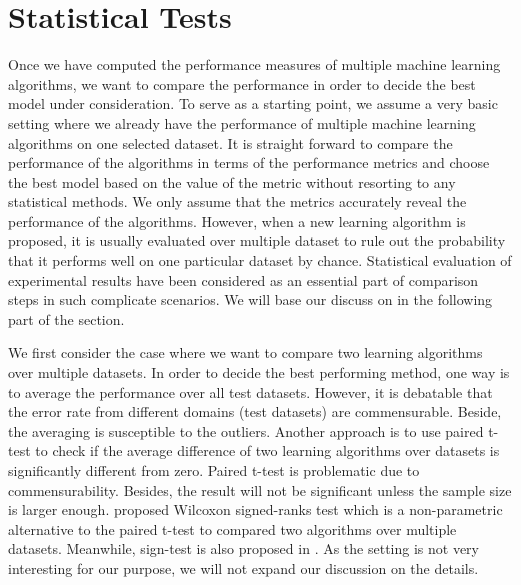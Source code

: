 {%
%
\section{Statistical Tests} \label{sc_st}

Once we have computed the performance measures of multiple machine learning algorithms, we want to compare the performance in order to decide the best model under consideration. 
To serve as a starting point, we assume a very basic setting where we already have the performance of multiple machine learning algorithms on one selected dataset.
It is straight forward to compare the performance of the algorithms in terms of the performance metrics and choose the best model based on the value of the metric without resorting to any statistical methods.
We only assume that the metrics accurately reveal the performance of the algorithms.
However, when a new learning algorithm is proposed, it is usually evaluated over multiple dataset to rule out the probability that it performs well on one particular dataset by chance.
Statistical evaluation of experimental results have been considered as an essential part of comparison steps in such complicate scenarios.
We will base our discuss on \citep{Demsar06statistical,Garcia08an} in the following part of the section.

We first consider the case where we want to compare two learning algorithms over multiple datasets.
In order to decide the best performing method, one way is to average the performance over all test datasets.
However, it is debatable that the error rate from different domains (test datasets) are commensurable.
Beside, the averaging is susceptible to the outliers.
Another approach is to use paired t-test to check if the average difference of two learning algorithms over datasets is significantly different from zero.
Paired t-test is problematic due to commensurability.
Besides, the result will not be significant unless the sample size is larger enough.
\citet{Demsar06statistical} proposed Wilcoxon signed-ranks test which is a non-parametric alternative to the paired t-test to compared two algorithms over multiple datasets.
Meanwhile, sign-test is also proposed in \citep{Demsar06statistical}.
As the setting is not very interesting for our purpose, we will not expand our discussion on the details.

}
